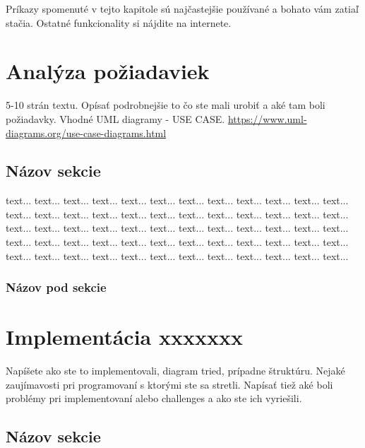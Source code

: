 Príkazy spomenuté v tejto kapitole sú najčastejšie používané a bohato vám zatiaľ stačia.
Ostatné funkcionality si nájdite na internete.

\clearpage

\chapter{Analýza požiadaviek}


5-10 strán textu.
Opísať podrobnejšie to čo ste mali urobiť a aké tam boli požiadavky.
Vhodné UML diagramy - USE CASE.
\url{https://www.uml-diagrams.org/use-case-diagrams.html}

\section{Názov sekcie}

 text...  text...  text...  text...  text...  text...  text...  text...  text...  text...  text...  text...  text...  text...  text...  text...  text...  text...  text...  text...  text...  text...  text...  text...  text...  text...  text...  text...  text...  text...  text...  text...  text...  text...  text...  text...  text...  text...  text...  text...  text...  text...  text...  text...  text...  text...  text...  text...  text...  text...  text...  text...  text...  text...  text...  text...  text...  text...  text...  text...


\subsection{Názov pod sekcie}
\clearpage

\chapter{Implementácia xxxxxxx}

Napíšete ako ste to implementovali, diagram tried, prípadne štruktúru.
Nejaké zaujímavosti pri programovaní s ktorými ste sa stretli.
Napísať tiež aké boli problémy pri implementovaní alebo challenges a ako ste ich vyriešili.


\section{Názov sekcie}

